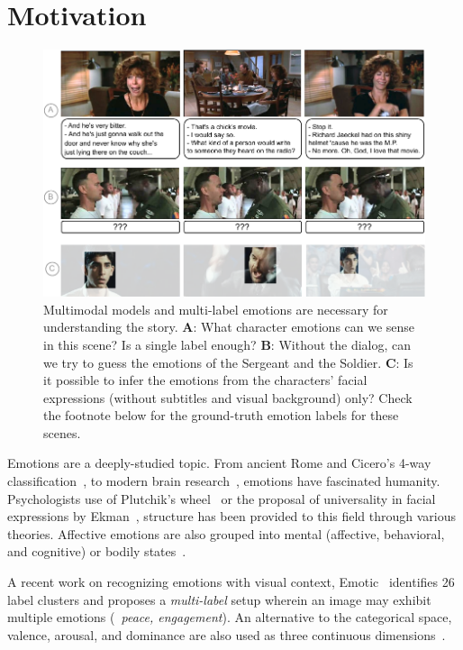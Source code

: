 \section{Motivation}
\label{sec:motivation}

\begin{figure}[t]
\centering
\includegraphics[width=0.7\linewidth]{Figures/teaser.pdf}
\vspace{-4mm}
\caption{Multimodal models and multi-label emotions are necessary for understanding the story.
\textbf{A}: What character emotions can we sense in this scene?
Is a single label enough?
\textbf{B}: Without the dialog, can we try to guess the emotions of the Sergeant and the Soldier.
\textbf{C}: Is it possible to infer the emotions from the characters' facial expressions (without subtitles and visual background) only?
Check the footnote below for the ground-truth emotion labels for these scenes.}
\label{fig:teaser}
\end{figure}

Emotions are a deeply-studied topic.
From ancient Rome and Cicero's 4-way classification~\cite{cicero-emo}, to modern brain research~\cite{progbrainres}, emotions have fascinated humanity.
Psychologists use of Plutchik's wheel~\cite{plutchik} or the proposal of universality in facial expressions by Ekman~\cite{Ekman1971}, structure has been provided to this field through various theories.
Affective emotions are also grouped into mental (affective, behavioral, and cognitive) or bodily states~\cite{clore1987affectivelexicon}.


A recent work on recognizing emotions with visual context, Emotic~\cite{emotic} identifies 26 label clusters and proposes a \emph{multi-label} setup wherein an image may exhibit multiple emotions (\eg~\emph{peace, engagement}).
An alternative to the categorical space, valence, arousal, and dominance are also used as three continuous dimensions~\cite{emotic}.

